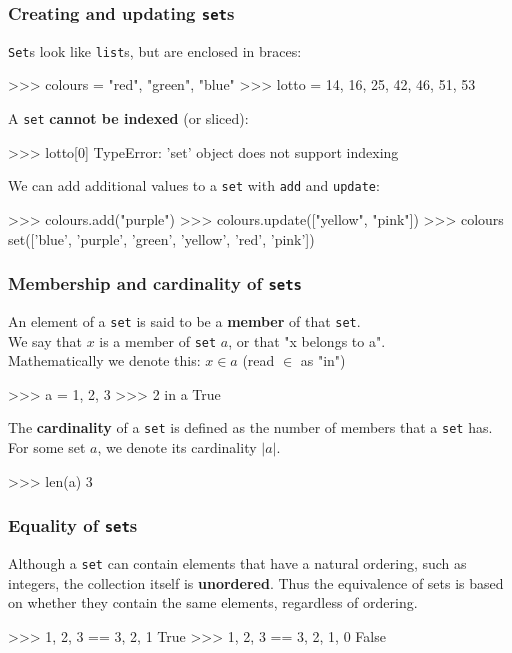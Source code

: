 \documentclass{beamer}
\begin{document}
\begin{frame}[fragile]
\frametitle{Creating and updating \texttt{set}s}
\texttt{Set}s look like \texttt{list}s, but are enclosed in braces:
\begin{code}
>>> colours = {"red", "green", "blue"}
>>> lotto = {14, 16, 25, 42, 46, 51, 53}
\end{code}

\vskip 0.2cm
A \texttt{set} \textbf{cannot be indexed} (or sliced):
\begin{code}
>>> lotto[0]
TypeError: 'set' object does not support indexing
\end{code}

\vskip 0.2cm
    We can add additional values to a \texttt{set} with \texttt{add} and \texttt{update}:
\begin{code}
>>> colours.add("purple")
>>> colours.update(["yellow", "pink"])
>>> colours
set(['blue', 'purple', 'green', 'yellow', 'red', 'pink'])
\end{code}
\end{frame}


\begin{frame}[fragile]
\frametitle{Membership and cardinality of \texttt{sets}}
An element of a \texttt{set} is said to be a \textbf{member} of that \texttt{set}.\\
    We say that $x$ is a member of \texttt{set} $a$, or that
    "x belongs to a".\\
    Mathematically we denote this: $x \in a$ (read $\in$ as "in")\\
\begin{code}
>>> a = {1, 2, 3}
>>> 2 in a
True
\end{code}

\bigskip
    The \textbf{cardinality} of a \texttt{set} is defined as the number of members that a \texttt{set} has.
    For some set $a$, we denote its cardinality $|a|$.\\
\begin{code}
>>> len(a)
3
\end{code}
\end{frame}

\begin{frame}[fragile]
\frametitle{Equality of \texttt{set}s}
Although a \texttt{set} can contain elements that have a natural ordering, such as
integers, the collection itself is \textbf{unordered}. Thus the equivalence of sets
is based on whether they contain the same elements, regardless of ordering.
\begin{code}
>>> {1, 2, 3} == {3, 2, 1}
True
>>> {1, 2, 3} == {3, 2, 1, 0}
False
\end{code}
\end{frame}
\end{document}
